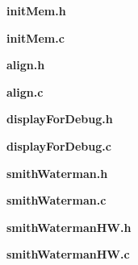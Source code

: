 \textbf{initMem.h}

\textbf{initMem.c}



\textbf{align.h}

\textbf{align.c}

\textbf{displayForDebug.h}

\textbf{displayForDebug.c}

\textbf{smithWaterman.h}

\textbf{smithWaterman.c}

\textbf{smithWatermanHW.h}

\textbf{smithWatermanHW.c}




